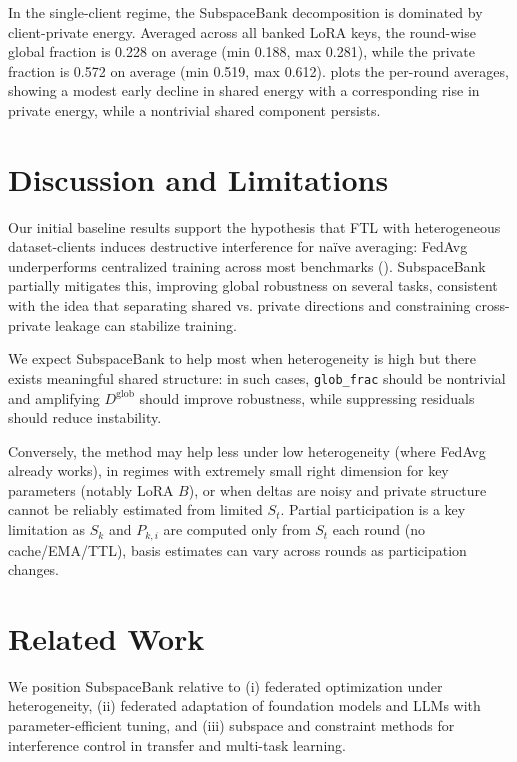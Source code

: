 \documentclass{article}
\theoremstyle{plain}
\theoremstyle{definition}
\theoremstyle{remark}
\begin{document}
In the single-client regime, the SubspaceBank decomposition is dominated by client-private energy. Averaged across all banked LoRA keys, the round-wise global fraction is 0.228 on average (min 0.188, max 0.281), while the private fraction is 0.572 on average (min 0.519, max 0.612).  plots the per-round averages, showing a modest early decline in shared energy with a corresponding rise in private energy, while a nontrivial shared component persists.


\section{Discussion and Limitations}
\label{sec:discussion}

Our initial baseline results support the hypothesis that FTL with heterogeneous dataset-clients induces destructive interference for naïve averaging: FedAvg underperforms centralized training across most benchmarks (). SubspaceBank partially mitigates this, improving global robustness on several tasks, consistent with the idea that separating shared vs. private directions and constraining cross-private leakage can stabilize training.

We expect SubspaceBank to help most when heterogeneity is high but there exists meaningful shared structure: in such cases, \texttt{glob\_frac} should be nontrivial and amplifying $D^{\mathrm{glob}}$ should improve robustness, while suppressing residuals should reduce instability. 

Conversely, the method may help less under low heterogeneity (where FedAvg already works), in regimes with extremely small right dimension for key parameters (notably LoRA $B$), or when deltas are noisy and private structure cannot be reliably estimated from limited $S_t$. Partial participation is a key limitation as $S_k$ and $P_{k,i}$ are computed only from $S_t$ each round (no cache/EMA/TTL), basis estimates can vary across rounds as participation changes.




\section{Related Work}
\label{sec:related}

We position SubspaceBank relative to (i) federated optimization under heterogeneity, (ii) federated adaptation of foundation models and LLMs with parameter-efficient tuning, and (iii) subspace and constraint methods for interference control in transfer and multi-task learning.
\end{document}
